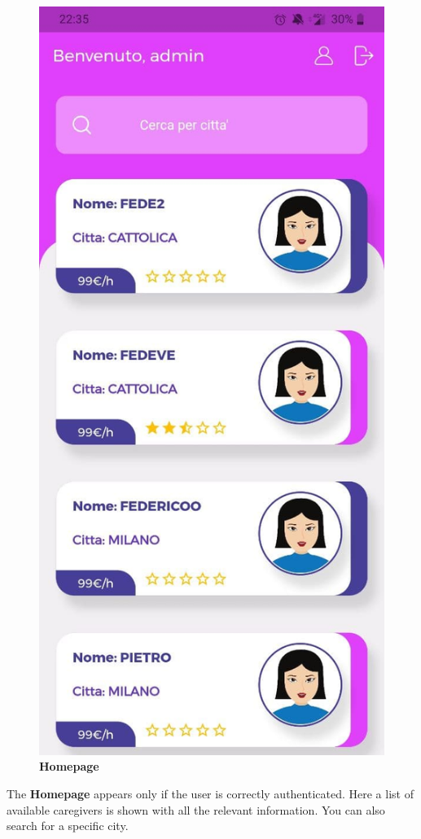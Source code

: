 \documentclass[../../dd.tex]{subfiles}
\begin{document}
    \begin{figure}[H]
        \centering
        \includegraphics[height=.6\textheight]{../../assets/screens/homepage.jpg}
        \caption{\textbf{Homepage}}\label{fig:figure}
    \end{figure}
    \begin{center}
        The \textbf{Homepage} appears only if the user is correctly authenticated.
        Here a list of available caregivers is shown with all the relevant information.
        You can also search for a specific city.
    \end{center}
\end{document}
